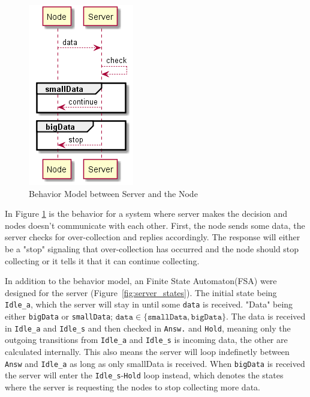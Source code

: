 \begin{figure}[ht]
    \includegraphics{include/figures/server_behav}
    \caption{Behavior Model between Server and the Node}
    \label{fig:node_server_behav}
\end{figure}

In Figure \ref{fig:node_server_behav} is the behavior for a system where server makes the decision and nodes doesn't communicate with each other. First, the node sends some data, the server checks for over-collection and replies accordingly. The response will either be a "stop" signaling that over-collection has occurred and the node should stop collecting or it tells it that it can continue collecting. 

In addition to the behavior model, an Finite State Automaton(FSA) were designed for the server (Figure~\ref{fig:server_states}). The initial state being \texttt{Idle\_a}, which the server will stay in until some \texttt{data} is received. "Data" being either \texttt{bigData} or \texttt{smallData}; $ \texttt{data} \in \{ \texttt{smallData}, \texttt{bigData} \} $. The data is received in \texttt{Idle\_a} and \texttt{Idle\_s} and then checked in \texttt{Answ.} and \texttt{Hold}, meaning only the outgoing transitions from \texttt{Idle\_a} and \texttt{Idle\_s} is incoming data, the other are calculated internally. This also means the server will loop indefinetly between \texttt{Answ} and \texttt{Idle\_a} as long as only smallData is received. When \texttt{bigData} is received the server will enter the \texttt{Idle\_s}-\texttt{Hold} loop instead, which denotes the states where the server is requesting the nodes to stop collecting more data. 



